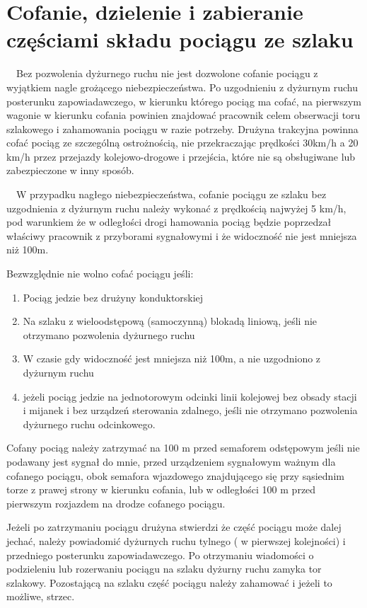 \section{Cofanie, dzielenie i zabieranie częściami składu pociągu ze szlaku}

\ \ Bez pozwolenia dyżurnego ruchu nie jest dozwolone cofanie pociągu z wyjątkiem nagle grożącego niebezpieczeństwa. Po
uzgodnieniu z dyżurnym ruchu posterunku zapowiadawczego, w kierunku którego pociąg ma cofać, na pierwszym wagonie w
kierunku cofania powinien znajdować pracownik celem obserwacji toru szlakowego i zahamowania pociągu w razie potrzeby.
Drużyna trakcyjna powinna cofać pociąg ze szczególną ostrożnością, nie przekraczając prędkości 30km/h a 20 km/h przez
przejazdy kolejowo-drogowe i przejścia, które nie są obsługiwane lub zabezpieczone w inny sposób.

\ \ W przypadku nagłego niebezpieczeństwa, cofanie pociągu ze szlaku bez uzgodnienia z dyżurnym ruchu należy wykonać z
prędkością najwyżej 5 km/h, pod warunkiem że w odległości drogi hamowania pociąg będzie poprzedzał właściwy pracownik z
przyborami sygnałowymi i że widoczność nie jest mniejsza niż 100m.

Bezwzględnie nie wolno cofać pociągu jeśli:

\begin{enumerate}
\item Pociąg jedzie bez drużyny konduktorskiej
\item Na szlaku z wieloodstępową (samoczynną) blokadą liniową, jeśli nie otrzymano pozwolenia dyżurnego ruchu
\item W czasie gdy widoczność jest mniejsza niż 100m, a nie uzgodniono z dyżurnym ruchu
\item jeżeli pociąg jedzie na jednotorowym odcinki linii kolejowej bez obsady stacji i mijanek i bez urządzeń sterowania
zdalnego, jeśli nie otrzymano pozwolenia dyżurnego ruchu odcinkowego.
\end{enumerate}
Cofany pociąg należy zatrzymać na 100 m przed semaforem odstępowym jeśli nie podawany jest sygnał do mnie, przed
urządzeniem sygnałowym ważnym dla cofanego pociągu, obok semafora wjazdowego znajdującego się przy sąsiednim torze z
prawej strony w kierunku cofania, lub w odległości 100 m przed pierwszym rozjazdem na drodze cofanego pociągu.

Jeżeli po zatrzymaniu pociągu drużyna stwierdzi że część pociągu może dalej jechać, należy powiadomić dyżurnych ruchu tylnego ( w pierwszej kolejności) i przedniego posterunku zapowiadawczego. Po otrzymaniu wiadomości o podzieleniu lub rozerwaniu pociągu na szlaku dyżurny ruchu zamyka tor szlakowy. Pozostającą na szlaku część pociągu należy zahamować i jeżeli to możliwe, strzec.

